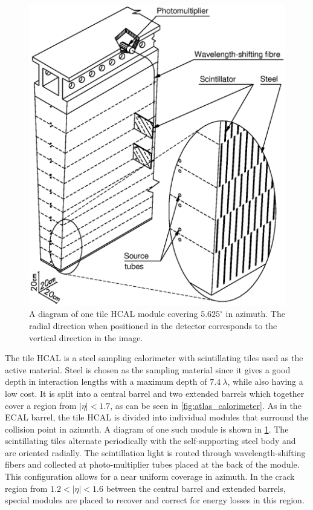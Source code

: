 \begin{figure}[ht]
\centering
\includegraphics[width=.6\textwidth]{figures/atlas/hcal_module.eps}
\caption{ A diagram of one tile HCAL module 
covering $5.625^{\circ}$ in azimuth. The radial direction when 
positioned in the detector corresponds to the vertical direction in the
image.}
\label{fig:atlas_hcal_module}
\end{figure}


The tile HCAL is a steel sampling calorimeter with scintillating tiles used as the 
active material.
Steel is chosen as the sampling material since it gives a good
depth in interaction lengths  with a maximum depth
of $7.4~\lambda$, while also having a low cost.
It is split into a central barrel and two extended barrels 
which together cover a 
region from $|\eta|< 1.7$, as can be seen in \fig\ref{fig:atlas_calorimeter}.
As in the ECAL barrel, the tile HCAL is divided into individual modules
that surround the collision point in azimuth. A diagram of one such
module is shown in \fig\ref{fig:atlas_hcal_module}.
The scintillating tiles alternate periodically with the self-supporting
steel body and are oriented radially. 
The scintillation
light is routed through wavelength-shifting fibers and collected
at photo-multiplier tubes placed at the back of the module.
This configuration allows for a near uniform coverage in azimuth.  
In the crack region from $1.2 < |\eta| < 1.6$ between the central barrel 
and extended barrels, special modules are placed to recover and correct
for energy losses in this region.

